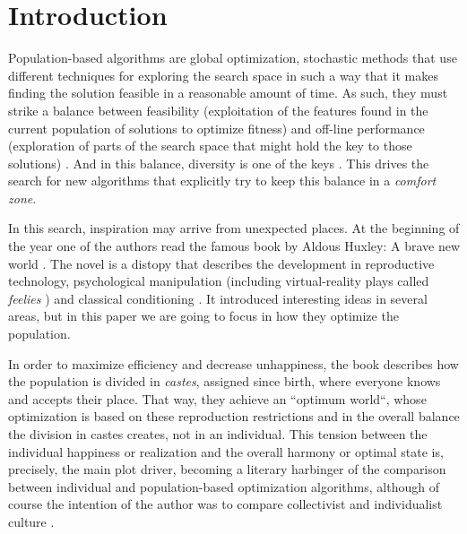 \section{Introduction}

Population-based algorithms \cite{prugel2010benefits} are global optimization, stochastic
methods that use different techniques for exploring the search space
in such a way that it makes finding the solution feasible in a
reasonable amount of time. As such, they must strike a balance between
feasibility (exploitation of the features found in the current
population of solutions to optimize fitness) and off-line performance
(exploration of parts of the search space that might hold the key to
those solutions) \cite{xu2014exploration}. And in this balance,
diversity is one of the keys \cite{alba2005exploration}. This drives
the search for new algorithms that explicitly try to keep this balance
in a {\em comfort zone}.

In this search, inspiration may arrive from unexpected places.
At the beginning of the year one of the authors read the famous book
by Aldous Huxley: A brave new world \cite{huxley2007brave}. The novel
is a distopy that describes the development in reproductive
technology, psychological manipulation (including virtual-reality
plays called {\em feelies} \cite{lecakes2021matrix}) and classical
conditioning \cite{bernheim2002addiction}. It introduced interesting
ideas in several areas, but in this paper we are going to focus in how
they optimize the population.

In order to maximize efficiency and decrease unhappiness, the book
describes how the population is divided in \textit{castes}, assigned
since birth, where everyone knows and accepts their place. That way,
they achieve an ``optimum world``, whose optimization is based on
these reproduction restrictions and in the overall balance the division in
castes creates, not in an individual. This tension between the
individual happiness or realization and the overall harmony or optimal
state is, precisely, the main plot driver, becoming a literary
harbinger of the comparison between individual and population-based
optimization algorithms, although of course the intention of the
author was to compare collectivist and individualist culture
\cite{mathews2012happiness}.

